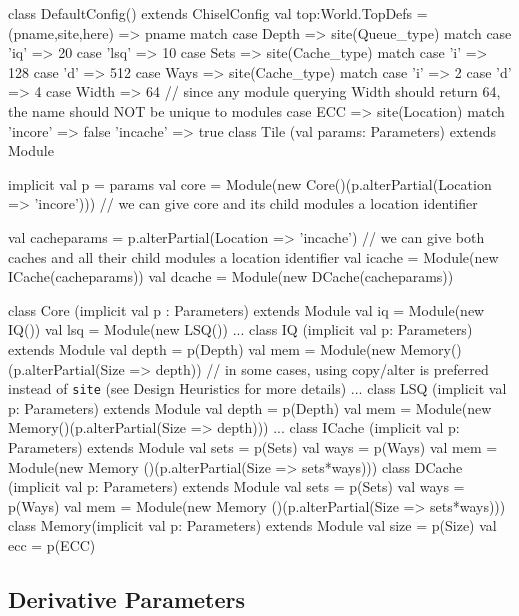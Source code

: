 \documentclass[10pt,twocolumn]{article}
\def\code#1{{\small\tt #1}}
\begin{document}
\begin{scala}
class DefaultConfig() extends ChiselConfig {
  val top:World.TopDefs = {
    (pname,site,here) => pname match {
      case Depth => site(Queue_type) match {
        case 'iq' => 20
        case 'lsq' => 10
      }
      case Sets => site(Cache_type) match {
        case 'i' => 128
        case 'd' => 512
      }
      case Ways => site(Cache_type) match {
        case 'i' => 2
        case 'd' => 4
      }
      case Width => 64
      // since any module querying Width should return 64, the name should NOT be unique to modules
      case ECC => site(Location) match {
        'incore' => false
        'incache' => true
      }
    }
  }
}
class Tile (val params: Parameters) extends Module { 
  implicit val p = params
  val core = Module(new Core()(p.alterPartial({Location => 'incore'})))
  // we can give core and its child modules a location identifier
  
  val cacheparams = p.alterPartial({Location => 'incache'})
  // we can give both caches and all their child modules a location identifier
  val icache = Module(new ICache(cacheparams))
  val dcache = Module(new DCache(cacheparams))
}
class Core (implicit val p : Parameters) extends Module {
  val iq = Module(new IQ())
  val lsq = Module(new LSQ())
  ...
}
class IQ (implicit val p: Parameters) extends Module {
  val depth = p(Depth)
  val mem = Module(new Memory()(p.alterPartial({Size => depth}))
  // in some cases, using copy/alter is preferred instead of \code{site} (see Design Heuristics for more details)
  ...
}
class LSQ (implicit val p: Parameters) extends Module {
  val depth = p(Depth)
  val mem = Module(new Memory()(p.alterPartial({Size => depth})))
  ...
}
class ICache (implicit val p: Parameters) extends Module {
  val sets = p(Sets)
  val ways = p(Ways)
  val mem = Module(new Memory ()(p.alterPartial({Size => sets*ways})))
}
class DCache (implicit val p: Parameters) extends Module {
  val sets = p(Sets)
  val ways = p(Ways)
  val mem = Module(new Memory ()(p.alterPartial({Size => sets*ways})))
}
class Memory(implicit val p: Parameters) extends Module {
  val size = p(Size)
  val ecc = p(ECC)
}
\end{scala}

\subsection{Derivative Parameters}
\end{document}

